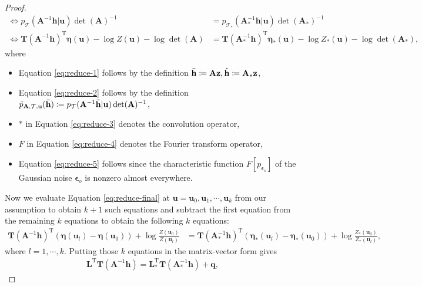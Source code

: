 \documentclass[10pt]{article} %
\theoremstyle{plain}
\theoremstyle{definition}
\begin{document}
\begin{proof}
\begin{align}
        \iff p_{\mathcal{T}}(\mathbf{A}^{-1}\mathbf{h}|\mathbf{u})\det(\mathbf{A})^{-1} &= p_{\mathcal{T}_{*}}(\mathbf{A}_{*}^{-1}\mathbf{h}|\mathbf{u})\det(\mathbf{A}_{*})^{-1}\\
        \iff \mathbf{T}(\mathbf{A}^{-1}\mathbf{h})^{\text{T}}\boldsymbol{\eta}(\mathbf{u})-\log Z(\mathbf{u})-\log\det(\mathbf{A}) &= \mathbf{T}(\mathbf{A}_{*}^{-1}\mathbf{h})^{\text{T}}\boldsymbol{\eta}_{*}(\mathbf{u})-\log Z_*(\mathbf{u})-\log\det(\mathbf{A}_{*}),\label{eq:reduce-final}
    \end{align}
    where
    \begin{itemize}
        \item Equation \eqref{eq:reduce-1} follows by the definition $\Bar{\mathbf{h}}\coloneqq\mathbf{A}\mathbf{z},\Hat{\mathbf{h}}\coloneqq\mathbf{A}_{*}\mathbf{z}$,
        \item Equation \eqref{eq:reduce-2} follows by the definition $\Tilde{p}_{\mathbf{A},\mathcal{T},\mathbf{u}}(\Bar{\mathbf{h}})\coloneqq p_{\mathcal{T}}(\mathbf{A}^{-1}\Bar{\mathbf{h}}|\mathbf{u})\det(\mathbf{A})^{-1}$,
        \item $*$ in Equation \eqref{eq:reduce-3} denotes the convolution operator,
        \item $F$ in Equation \eqref{eq:reduce-4} denotes the Fourier transform operator,
        \item Equation \eqref{eq:reduce-5} follows since the characteristic function $F[p_{\boldsymbol{\epsilon}_o}]$ of the Gaussian noise $\boldsymbol{\epsilon}_o$ is nonzero almost everywhere.
    \end{itemize}
    Now we evaluate Equation \eqref{eq:reduce-final} at $\mathbf{u}=\mathbf{u}_0,\mathbf{u}_1,\cdots,\mathbf{u}_k$ from our assumption to obtain $k+1$ such equations and subtract the first equation from the remaining $k$ equations to obtain the following $k$ equations:
    \begin{align}
        \mathbf{T}(\mathbf{A}^{-1}\mathbf{h})^{\text{T}}(\boldsymbol{\eta}(\mathbf{u}_l)-\boldsymbol{\eta}(\mathbf{u}_0))+\log \frac{Z(\mathbf{u}_0)}{Z(\mathbf{u}_l)} &= \mathbf{T}(\mathbf{A}_{*}^{-1}\mathbf{h})^{\text{T}}(\boldsymbol{\eta}_{*}(\mathbf{u}_l)-\boldsymbol{\eta}_{*}(\mathbf{u}_0))+\log \frac{Z_*(\mathbf{u}_0)}{Z_*(\mathbf{u}_l)},
    \end{align}
    where $l=1,\cdots,k$. Putting those $k$ equations in the matrix-vector form gives
    \begin{align}
        \mathbf{L}^{\text{T}}\mathbf{T}(\mathbf{A}^{-1}\mathbf{h})=\mathbf{L}_{*}^{\text{T}}\mathbf{T}(\mathbf{A}_{*}^{-1}\mathbf{h}) +\mathbf{q},\label{eq:ivae-lin-wip}

\end{align}
\end{proof}
\end{document}
